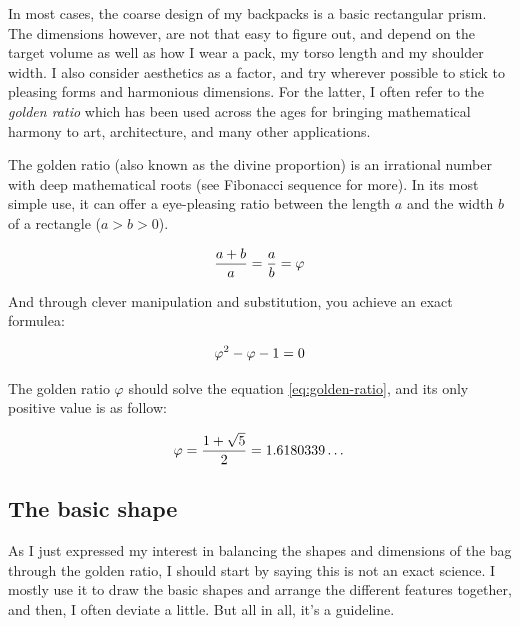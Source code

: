 In most cases, the coarse design of my backpacks is a basic rectangular prism. The dimensions however, are not that easy to figure out, and depend on the target volume as well as how I wear a pack, my torso length and my shoulder width. I also consider aesthetics as a factor, and try wherever possible to stick to pleasing forms and harmonious dimensions. For the latter, I often refer to the \textit{golden ratio} which has been used across the ages for bringing mathematical harmony to art, architecture, and many other applications.

\begin{note}
  The golden ratio (also known as the divine proportion) is an irrational number with deep mathematical roots (see Fibonacci sequence for more). In its most simple use, it can offer a eye-pleasing ratio between the length $a$ and the width $b$ of a rectangle ($a > b > 0$).

  \begin{equation}
    \centering
    \frac{a + b}{a} = \frac{a}{b}=\varphi
  \end{equation}

  And through clever manipulation and substitution, you achieve an exact formulea:

  \begin{equation}
    \centering
    \label{eq:golden-ratio}
    \varphi^2 - \varphi - 1 = 0
  \end{equation}

  The golden ratio $\varphi$ should solve the equation \ref{eq:golden-ratio}, and its only positive value is as follow:

  \begin{equation}
    \centering
    \varphi = \frac{1 + \sqrt{5}}{2} = 1.6180339\dots
  \end{equation}

\end{note}

\subsection{The basic shape}

As I just expressed my interest in balancing the shapes and dimensions of the bag through the golden ratio, I should start by saying this is not an exact science. I mostly use it to draw the basic shapes and arrange the different features together, and then, I often deviate a little. But all in all, it's a guideline.

